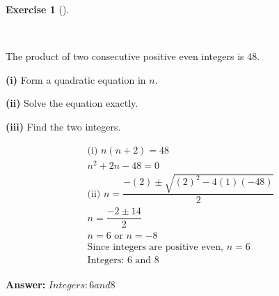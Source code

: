 \documentclass[
  letterpaper,
  DIV=11,
  numbers=noendperiod]{scrreprt}
\theoremstyle{definition}
\newtheorem{exercise}{Exercise}[chapter]
\theoremstyle{remark}
\begin{document}
\begin{exercise}[]\protect\hypertarget{exr-u6-25-2}{}\label{exr-u6-25-2}

~

The product of two consecutive positive even integers is 48.

\textbf{(i)} Form a quadratic equation in \(n\).

\textbf{(ii)} Solve the equation exactly.

\textbf{(iii)} Find the two integers.

\begin{tcolorbox}[enhanced jigsaw, opacitybacktitle=0.6, coltitle=black, arc=.35mm, colframe=quarto-callout-tip-color-frame, colback=white, bottomrule=.15mm, left=2mm, colbacktitle=quarto-callout-tip-color!10!white, titlerule=0mm, opacityback=0, title=\textcolor{quarto-callout-tip-color}{\faLightbulb}\hspace{0.5em}{🔍 View Solution}, leftrule=.75mm, breakable, rightrule=.15mm, bottomtitle=1mm, toptitle=1mm, toprule=.15mm]

\begin{align*}
\text{(i) } n(n+2) = 48 \\ n^2 + 2n - 48 = 0 \\ \text{(ii) } n = \dfrac{-(2) \pm \sqrt{(2)^2 - 4(1)(-48)}}{2} \\ n = \dfrac{-2 \pm 14}{2} \\ n = 6 \text{ or } n = -8 \\ \text{Since integers are positive even, } n = 6 \\ \text{Integers: } 6 \text{ and } 8
\end{align*}

\textbf{Answer:} \(Integers: 6 and 8\)

\end{tcolorbox}

\end{exercise}
\end{document}
